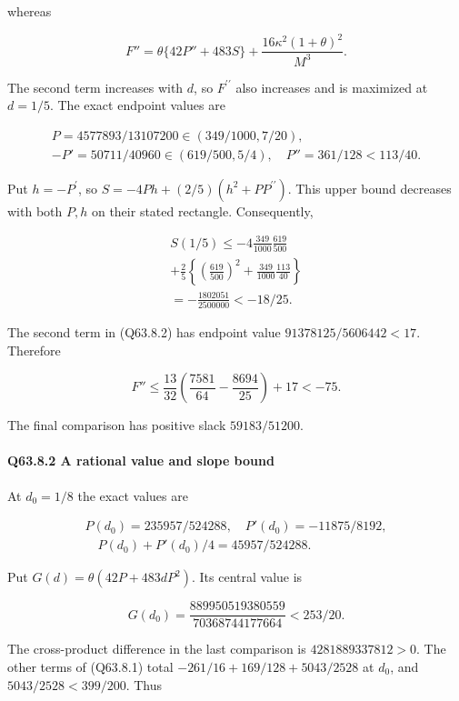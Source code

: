 whereas

\[
F''=\theta\{42P''+483S\}
+\frac{16\kappa^2(1+\theta)^2}{M^3}.
\tag{Q63.8.2}\label{eq:Q63:Q63:8:2}
\]

The second term increases with $d$, so $F^{\prime\prime}$ also increases and is maximized at $d=\allowbreak 1/5$.
The exact endpoint values are

\[
\begin{gathered}
P=4577893/13107200\in(349/1000,7/20),\qquad\\
-P'=50711/40960\in(619/500,5/4),\quad P''=361/128<113/40.
\end{gathered}
\]

Put $h=\allowbreak -P^\prime$, so $S=\allowbreak -4Ph+(2/5)(h^2+PP^{\prime\prime})$. This upper bound decreases with both $P,\allowbreak  h$ on their stated rectangle.
Consequently,

\[
\begin{gathered}
S(1/5)\le-4\frac{349}{1000}\frac{619}{500}\\
+\frac25\left\{\left(\frac{619}{500}\right)^2+\frac{349}{1000}\frac{113}{40}\right\}\\
=-\frac{1802051}{2500000}<-18/25.
\end{gathered}
\]

The second term in (Q63.8.2) has endpoint value $91378125/5606442<\allowbreak 17$.
Therefore

\[
F''\le\frac{13}{32}\left(\frac{7581}{64}-\frac{8694}{25}\right)+17<-75.\tag{Q63.8.3}\label{eq:Q63:Q63:8:3}
\]

The final comparison has positive slack $59183/51200$.

\paragraph{Q63.8.2 A rational value and slope bound}

At $d_0=\allowbreak 1/8$ the exact values are

\[
\begin{gathered}
P(d_0)=235957/524288,\quad P'(d_0)=-11875/8192,\\
\quad P(d_0)+P'(d_0)/4=45957/524288.
\end{gathered}
\]

Put $G(d)=\allowbreak \theta(42P+483dP^2)$. Its central value is

\[
G(d_0)=\frac{889950519380559}{70368744177664}<253/20.
\]

The cross-product difference in the last comparison is $4281889337812>\allowbreak 0$.
The other terms of (Q63.8.1) total $-261/16+169/128+5043/2528$ at $d_0$, and $5043/2528<\allowbreak 399/200$.
Thus

